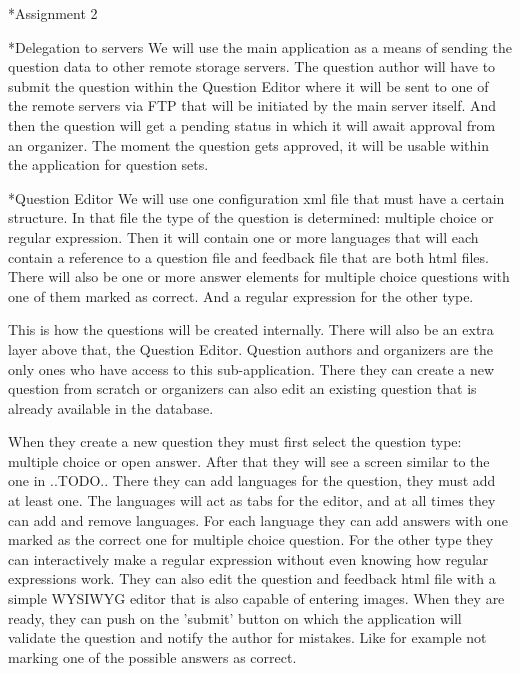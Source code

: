 \begin{section}*{Assignment 2}
    \begin{subsection}*{Delegation to servers}
        We will use the main application as a means of sending the question data to other
        remote storage servers. The question author will have to submit the question within
        the Question Editor where it will be sent to one of the remote servers via FTP that
        will be initiated by the main server itself. And then the question will get a
        pending status in which it will await approval from an organizer. The moment
        the question gets approved, it will be usable within the application for question
        sets.
    \end{subsection}
    
    \begin{subsection}*{Question Editor}
        We will use one configuration xml file that must have a certain structure. In
        that file the type of the question is determined: multiple choice or regular
        expression. Then it will contain one or more languages that will each contain a
        reference to a question file and feedback file that are both html files. There
        will also be one or more answer elements for multiple choice questions with one
        of them marked as correct. And a regular expression for the other type.
        
        This is how the questions will be created internally. There will also be an extra
        layer above that, the Question Editor.
        Question authors and organizers are the only ones who have access to this
        sub-application. There they can create a new question from scratch or organizers
        can also edit an existing question that is already available in the database.
        
        When they create a new question they must first select the question type:
        multiple choice or open answer. After that they will see a screen similar to the
        one in ..TODO.. There they can add languages for the question, they must add at
        least one. The languages will act as tabs for the editor, and at all times they
        can add and remove languages. For each language they can add answers with
        one marked as the correct one for multiple choice question. For the other type
        they can interactively make a regular expression without even knowing how
        regular expressions work. They can also edit the question and feedback html file
        with a simple WYSIWYG editor that is also capable of entering images.
        When they are ready, they can push on the 'submit' button on which the application
        will validate the question and notify the author for mistakes. Like for example
        not marking one of the possible answers as correct.
        

\end{subsection}
\end{section}
